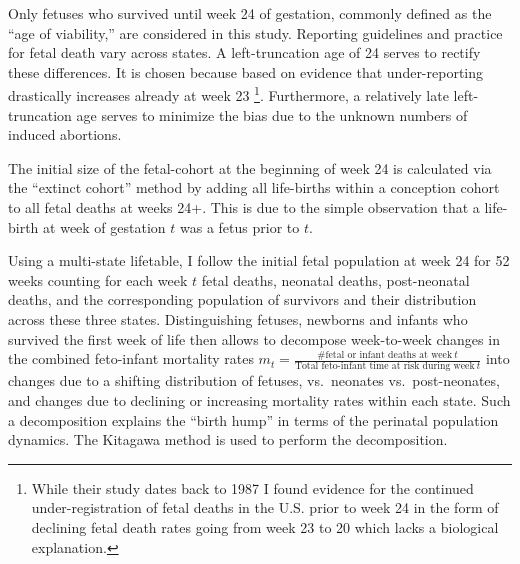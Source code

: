 \documentclass[10pt, twoside]{article}
\let\oldfootnote\footnote
\renewcommand\footnote[1]{%
\oldfootnote{\hspace{0.6mm}#1}}
\begin{document}
Only fetuses who survived until week 24 of gestation, commonly defined as the ``age of viability,'' are considered in this study. Reporting guidelines and practice for fetal death vary across states. A left-truncation age of 24 serves to rectify these differences. It is chosen because based on evidence that under-reporting drastically increases already at week 23 \citep{Greb1987}\footnote{While their study dates back to 1987 I found evidence for the continued under-registration of fetal deaths in the U.S. prior to week 24 in the form of declining fetal death rates going from week 23 to 20 which lacks a biological explanation.}. Furthermore, a relatively late left-truncation age serves to minimize the bias due to the unknown numbers of induced abortions.

The initial size of the fetal-cohort at the beginning of week 24 is calculated via the ``extinct cohort'' method \citep{Bakketeig1978, Feldman1992} by adding all life-births within a conception cohort to all fetal deaths at weeks 24+. This is due to the simple observation that a life-birth at week of gestation \(t\) was a fetus prior to \(t\).

Using a multi-state lifetable, I follow the initial fetal population at week 24 for 52 weeks counting for each week \(t\) fetal deaths, neonatal deaths, post-neonatal deaths, and the corresponding population of survivors and their distribution across these three states. Distinguishing fetuses, newborns and infants who survived the first week of life then allows to decompose week-to-week changes in the combined feto-infant mortality rates \(m_t = \frac {\text{\# fetal or infant deaths at week}~t} {\text{Total feto-infant time at risk during week}~t}\) into changes due to a shifting distribution of fetuses, vs.~neonates vs.~post-neonates, and changes due to declining or increasing mortality rates within each state. Such a decomposition explains the ``birth hump'' in terms of the perinatal population dynamics. The Kitagawa method \citep{Kitagawa1955} is used to perform the decomposition.

\clearpage
\end{document}
